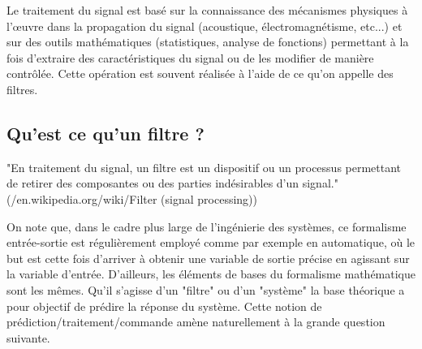 \documentclass[11pt,a4paper]{article}
\begin{document}
Le traitement du signal est basé sur la connaissance des mécanismes physiques à l’œuvre dans la propagation du signal (acoustique, électromagnétisme, etc...) et sur des outils mathématiques (statistiques, analyse de fonctions) permettant à la fois d'extraire des caractéristiques du signal ou de les modifier de manière contrôlée. Cette opération est souvent réalisée à l'aide de ce qu'on appelle des filtres. \\
 
\subsection{Qu'est ce qu'un filtre ?}
"En traitement du signal, un filtre est un dispositif ou un processus permettant de retirer des composantes ou des parties indésirables d'un signal." (/en.wikipedia.org/wiki/Filter (signal processing))\\

\vspace{0.5cm}

\begin{center}
\end{center}

\vspace{0.5cm}

On note que, dans le cadre plus large de l'ingénierie des systèmes, ce formalisme entrée-sortie est régulièrement employé comme par exemple en automatique, où le but est cette fois d'arriver à obtenir une variable de sortie précise en agissant sur la variable d'entrée. D'ailleurs, les éléments de bases du formalisme mathématique sont les mêmes. Qu'il s'agisse d'un "filtre" ou d'un "système" la base théorique a pour objectif de prédire la réponse du système. Cette notion de prédiction/traitement/commande amène naturellement à la grande question suivante.
\end{document}
